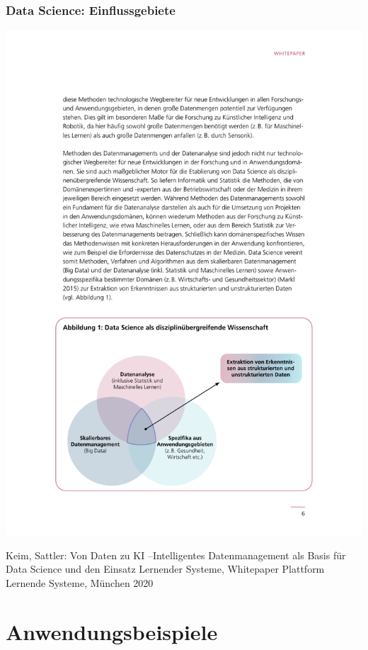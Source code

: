   \begin{frame}
    \frametitle{Data Science: Einflussgebiete}

    \begin{center}
      \includegraphics[scale=.7]{fig1/ds-einfluss.pdf}
      \end{center}

  \tiny{Keim, Sattler: Von Daten zu KI --Intelligentes Datenmanagement als Basis für Data Science und den Einsatz Lernender Systeme, Whitepaper Plattform Lernende Systeme, München 2020}
  \end{frame}


\section{Anwendungsbeispiele}

